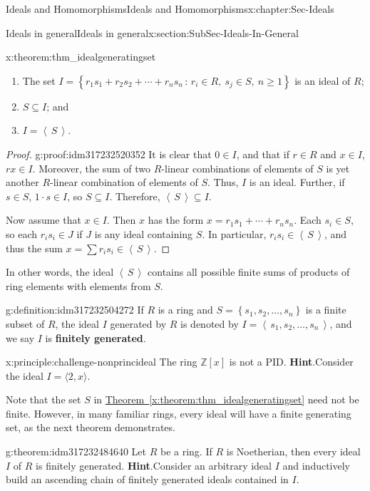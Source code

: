 \documentclass[oneside,10pt,]{book}
\newcommand{\blocktitlefont}{\relax}
\newcommand{\xreffont}{\relax}
\newcommand{\terminology}[1]{\textbf{#1}}
\numberwithin{equation}{section}
\renewcommand{\ge}{\geqslant}
\newcommand{\ideal}[1]{\left\langle\, #1 \,\right\rangle}
\newcommand{\set}[1]{\left\{ {#1} \right\}}
\newcommand{\setof}[2]{{\left\{#1\,\colon\,#2\right\}}}
\def\Z{{\mathbb Z}}
\begin{document}
\begin{chapterptx}{Ideals and Homomorphisms}{}{Ideals and Homomorphisms}{}{}{x:chapter:Sec-Ideals}
\begin{sectionptx}{Ideals in general}{}{Ideals in general}{}{}{x:section:SubSec-Ideals-In-General}
\begin{theorem}{}{}{x:theorem:thm_idealgeneratingset}
\begin{enumerate}
\item{}The set \(I = \setof{r_1 s_1 + r_2 s_2 + \cdots + r_n s_n}{r_i\in R, \ s_j \in S,\ n\ge 1}\) is an ideal of \(R\);%
\item{}\(S\subseteq I\); and%
\item{}\(I = \ideal{S}\).%
\end{enumerate}
%
\end{theorem}
\begin{proof}{}{g:proof:idm317232520352}
It is clear that \(0\in I\), and that if \(r\in R\) and \(x\in I\), \(rx\in I\). Moreover, the sum of two \(R\)-linear combinations of elements of \(S\) is yet another \(R\)-linear combination of elements of \(S\). Thus, \(I\) is an ideal. Further, if \(s\in S\), \(1\cdot s \in I\), so \(S\subseteq I\). Therefore, \(\ideal{S}\subseteq I\).%
\par
Now assume that \(x\in I\). Then \(x\) has the form \(x = r_1 s_1 + \cdots + r_n s_n\). Each \(s_i \in S\), so each \(r_i s_i \in J\) if \(J\) is any ideal containing \(S\). In particular, \(r_i s_i \in \ideal{S}\), and thus the sum \(x = \sum r_i s_i \in \ideal{S}\).%
\end{proof}
In other words, the ideal \(\ideal{S}\) contains all possible finite sums of products of ring elements with elements from \(S\).%
\begin{definition}{}{g:definition:idm317232504272}%
If \(R\) is a ring and \(S = \set{s_1, s_2, \ldots,
s_n}\) is a finite subset of \(R\), the ideal \(I\) generated by \(R\) is denoted by \(I = \ideal{s_1, s_2, \ldots,
s_n}\), and we say \(I\) is \terminology{finitely generated}.%
\end{definition}
\begin{principle}{}{}{x:principle:challenge-nonprincideal}%
The ring \(\Z[x]\) is not a PID.%
\textbf{\blocktitlefont Hint}.\quad{}Consider the ideal \(I = \langle 2, x \rangle\).%
\end{principle}
Note that the set \(S\) in \hyperref[x:theorem:thm_idealgeneratingset]{Theorem~{\xreffont\ref{x:theorem:thm_idealgeneratingset}}} need not be finite. However, in many familiar rings, every ideal will have a finite generating set, as the next theorem demonstrates.%
\begin{theorem}{}{}{g:theorem:idm317232484640}%
Let \(R\) be a ring. If \(R\) is Noetherian\footnotemark{}, then every ideal \(I\) of \(R\) is finitely generated.%
\textbf{\blocktitlefont Hint}.\quad{}Consider an arbitrary ideal \(I\) and inductively build an ascending chain of finitely generated ideals contained in \(I\).%

\end{theorem}
\end{sectionptx}
\end{chapterptx}
\end{document}
